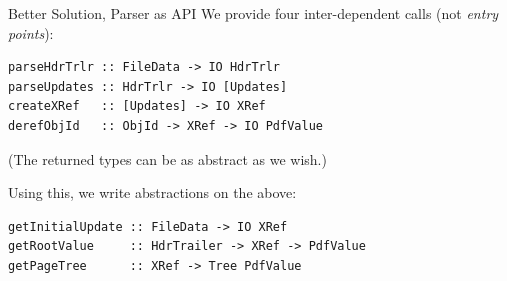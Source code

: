 \documentclass[t,10pt,xcolor={dvipsnames}]{beamer}
\begin{document}
\begin{frame}[label={sec:orgaeb63a5},fragile]{Better Solution, Parser as API}
 We provide four inter-dependent calls (not \emph{entry points}):
\lstset{language=haskell,label= ,caption= ,captionpos=b,numbers=none}
\begin{lstlisting}
parseHdrTrlr :: FileData -> IO HdrTrlr
parseUpdates :: HdrTrlr -> IO [Updates]
createXRef   :: [Updates] -> IO XRef
derefObjId   :: ObjId -> XRef -> IO PdfValue
\end{lstlisting}
(The returned types can be as abstract as we wish.)

\vspace{18pt}

Using this, we write abstractions on the above:
\lstset{language=haskell,label= ,caption= ,captionpos=b,numbers=none}
\begin{lstlisting}
getInitialUpdate :: FileData -> IO XRef
getRootValue     :: HdrTrailer -> XRef -> PdfValue
getPageTree      :: XRef -> Tree PdfValue
\end{lstlisting}
\end{frame}
\end{document}
